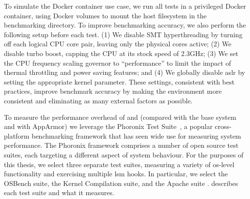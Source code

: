 To simulate the Docker container use case, we run all tests in a privileged Docker
container, using Docker volumes to mount the host filesystem in the benchmarking
directory. To improve benchmarking accuracy, we also perform the following setup before
each test. (1) We disable SMT hyperthreading by turning off each logical CPU core pair,
leaving only the physical cores active; (2) We disable turbo boost, capping the CPU at its
stock speed of 2.3GHz; (3) We set the CPU frequency scaling governor to
\enquote{performance} to limit the impact of thermal throttling and power saving features;
and (4) We globally disable \gls{aslr} by setting the appropriate kernel parameter. These
settings, consistent with best practices, improve benchmark accuracy by making the
environment more consistent and eliminating as many external factors as possible.

To measure the performance overhead of \bpfbox{} and \bpfcontain{} (compared with the base
system and with AppArmor) we leverage the Phoronix Test Suite~\cite{phoronix}, a popular
cross-platform benchmarking framework that has seen wide use for measuring system
performance. The Phoronix framework comprises a number of open source test suites, each
targeting a different aspect of system behaviour. For the purposes of this thesis, we
select three separate test suites, measuring a variety of \gls{os}-level functionality and
exercising multiple \gls{lsm} hooks. In particular, we select the OSBench suite, the
Kernel Compilation suite, and the Apache suite . describes each test suite and
what it measures.

